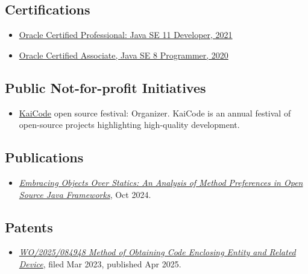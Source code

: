\documentclass{vl}
\begin{document}
    \subsection*{Certifications}

    \begin{itemize}
        \itemsep0em
        \item \href{https://catalog-education.oracle.com/pls/certview/sharebadge?id=87F6A2FE819A5A5AF4120A05900AB28A461EE9A3EE9FBFA02721FADAEB3BCE19}{Oracle Certified Professional: Java SE 11 Developer, 2021}
        \item \href{https://www.credly.com/badges/e2d9ddda-20dc-433d-8ab7-18548fd0fd8f/public_url}{Oracle Certified Associate, Java SE 8 Programmer, 2020}
    \end{itemize}

    \subsection*{Public Not-for-profit Initiatives}
    \begin{itemize}
        \itemsep0em
        \item \href{https://www.kaicode.org}{KaiCode} open source festival: Organizer.
        KaiCode is an annual festival of open-source projects highlighting high-quality development.
    \end{itemize}

    \subsection*{Publications}
    \begin{itemize}
        \itemsep0em
        \item\emph{\href{https://arxiv.org/abs/2410.05631}{Embracing Objects Over Statics:
        An Analysis of Method Preferences
        in Open Source Java Frameworks}}, Oct 2024.
    \end{itemize}

    \subsection*{Patents}
    \begin{itemize}
        \itemsep0em
        \item\emph{\href{https://patentscope.wipo.int/search/en/detail.jsf?docId=WO2025084948&_cid=P20-ME9V9B-07633-1}{WO/2025/084948 Method of Obtaining Code Enclosing Entity and Related Device}}, filed Mar 2023, published Apr 2025.
    \end{itemize}
\end{document}
